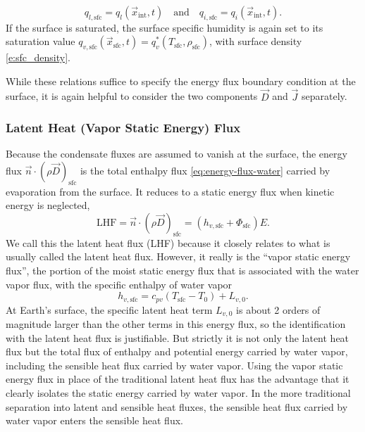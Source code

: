 \documentclass{report}
\begin{document}
\begin{enumerate}
    \[
    q_{l, \mathrm{sfc}} = q_l(\vec{x}_\mathrm{int}, t) \quad \text{and} \quad q_{i, \mathrm{sfc}} = q_i(\vec{x}_\mathrm{int}, t).
    \]
    If the surface is saturated, the surface specific humidity is again set to its saturation value $q_{v, \mathrm{sfc}}(\vec{x}_\mathrm{sfc}, t) =q_v^*(T_\mathrm{sfc}, \rho_\mathrm{sfc})$, with surface density \eqref{e:sfc_density}.
\end{enumerate}
While these relations suffice to specify the energy flux boundary condition at the surface, it is again helpful to consider the two components $\vec{D}$ and $\vec{J}$ separately. 

\subsubsection{Latent Heat (Vapor Static Energy) Flux}

Because the condensate fluxes are assumed to vanish at the surface, the energy flux $\vec{n} \cdot (\rho \vec{D})_{\mathrm{sfc}}$ is the total enthalpy flux \eqref{eq:energy-flux-water} carried by evaporation from the surface. It reduces to a static energy flux when kinetic energy is neglected,
\begin{equation}\label{e:sfc_LHF}
     \mathrm{LHF} = \vec{n} \cdot (\rho \vec{D})_{\mathrm{sfc}}   = (h_{v, \mathrm{sfc}} + \Phi_\mathrm{sfc}) E.
\end{equation}
We call this the latent heat flux (LHF) because it closely relates to what is usually called the latent heat flux. However, it really is the ``vapor static energy flux'', the portion of the moist static energy flux that is associated with the water vapor flux, with the specific enthalpy of water vapor
\[
h_{v, \mathrm{sfc}} = c_{pv} (T_\mathrm{sfc}-T_0) + L_{v,0}.
\]
At Earth's surface, the specific latent heat term $L_{v,0}$ is about 2 orders of magnitude larger than the other terms in this energy flux, so the identification with the latent heat flux is justifiable. But strictly it is not only the latent heat flux but the total flux of enthalpy and potential energy carried by water vapor, including the sensible heat flux carried by water vapor. Using the vapor static energy flux in place of the traditional latent heat flux has the advantage that it clearly isolates the static energy carried by water vapor. In the more traditional separation into latent and sensible heat fluxes, the sensible heat flux carried by water vapor enters the sensible heat flux.
\end{document}
